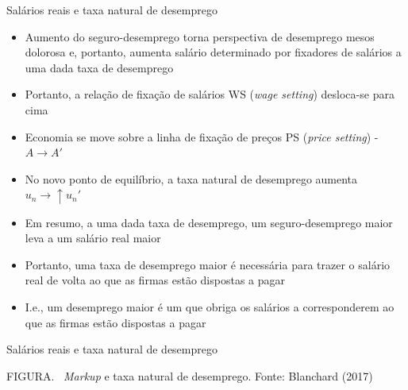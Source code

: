 \documentclass[10pt]{beamer}
\begin{document}
\begin{frame}
    {Salários reais e taxa natural de desemprego}
    \begin{itemize}
        \item Aumento do seguro-desemprego torna perspectiva de desemprego mesos dolorosa e, portanto, aumenta salário determinado por fixadores de salários a uma dada taxa de desemprego\bigskip
        \item Portanto, a relação de fixação de salários WS (\emph{wage setting}) desloca-se para cima\bigskip
        \item Economia se move sobre a linha de fixação de preços PS (\emph{price setting}) - $A \to A'$\bigskip
        \item No novo ponto de equilíbrio, a taxa natural de desemprego aumenta $u_n \to \uparrow u_n'$\bigskip
        \item Em resumo, a uma dada taxa de desemprego, um seguro-desemprego maior leva a um salário real maior\bigskip
        \item Portanto, uma taxa de desemprego maior é necessária para trazer o salário real de volta ao que as firmas estão dispostas a pagar\bigskip
        \item I.e., um desemprego maior é um  que obriga os salários a corresponderem ao que as firmas estão dispostas a pagar
    \end{itemize}
\end{frame}

\begin{frame}
    {Salários reais e taxa natural de desemprego}
    \begin{center}
		\begin{minipage}[b]{.5\textwidth}
			\tiny{{\scshape FIGURA}. \ \emph{Markup} e taxa natural de desemprego. Fonte: Blanchard (2017)} 
		\end{minipage}
	\end{center}
\end{frame}
\end{document}
